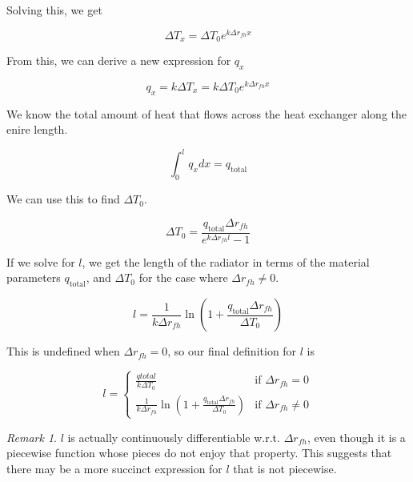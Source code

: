 \documentclass{article}
\numberwithin{equation}{subsection}
\theoremstyle{remark}
\newtheorem*{remark}{Remark}
\newcommand{\qtotal}{q_{\mathrm{total}}}
\newcommand{\DeltaT}{\Delta{}T}
\newcommand{\Deltarfh}{\Delta{}r_{fh}}
\begin{document}
Solving this, we get

\begin{equation}
\DeltaT_{x} = \DeltaT_{0} e^{k \Deltarfh x}
\end{equation}

From this, we can derive a new expression for \(q_{x}\)

\begin{equation}
q_{x} = k \DeltaT_{x} = k \DeltaT_{0} e^{k \Deltarfh x}
\end{equation}

We know the total amount of heat that flows across the heat exchanger along the enire length.

\begin{equation}
\int_{0}^{l} q_{x} dx = \qtotal
\end{equation}

We can use this to find \(\DeltaT_{0}\).

\begin{equation}
\DeltaT_{0} = \frac{\qtotal \Deltarfh}{e^{k \Deltarfh l} - 1}
\end{equation}

If we solve for \(l\), we get the length of the radiator in terms of the material parameters \(\qtotal\), and \(\DeltaT_{0}\) for the case where \(\Deltarfh \ne 0\).

\begin{equation}
l = \frac{1}{k \Deltarfh} \ln \left(1 + \frac{\qtotal \Deltarfh}{\DeltaT_{0}}\right)
\end{equation}

This is undefined when \(\Deltarfh = 0\), so our final definition for \(l\) is

\begin{equation}
\label{eqn:counterflow_l}
l =
\begin{cases}
	\frac{qtotal}{k \DeltaT_{0}} & \text{if } \Deltarfh = 0 \\
	\frac{1}{k \Deltarfh} \ln \left(1 + \frac{\qtotal \Deltarfh}{\DeltaT_{0}}\right) & \text{if } \Deltarfh \ne 0
\end{cases}
\end{equation}

\begin{remark}
\(l\) is actually continuously differentiable w.r.t. \(\Deltarfh\), even though it is a piecewise function whose pieces do not enjoy that property.
This suggests that there may be a more succinct expression for \(l\) that is not piecewise.
\end{remark}
\end{document}
